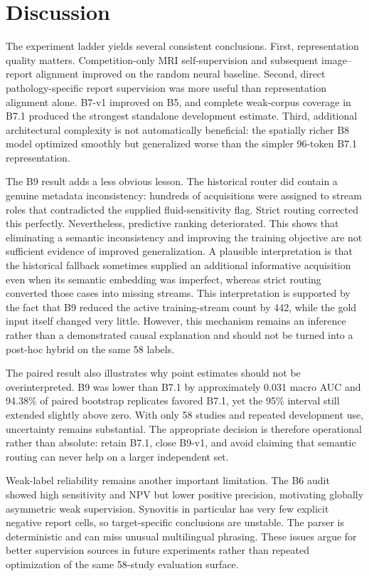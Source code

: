 \documentclass[preprint,12pt]{elsarticle}
\begin{document}
\section{Discussion}
\label{sec:discussion}

The experiment ladder yields several consistent conclusions. First, representation quality matters. Competition-only MRI self-supervision and subsequent image--report alignment improved on the random neural baseline. Second, direct pathology-specific report supervision was more useful than representation alignment alone. B7-v1 improved on B5, and complete weak-corpus coverage in B7.1 produced the strongest standalone development estimate. Third, additional architectural complexity is not automatically beneficial: the spatially richer B8 model optimized smoothly but generalized worse than the simpler 96-token B7.1 representation.

The B9 result adds a less obvious lesson. The historical router did contain a genuine metadata inconsistency: hundreds of acquisitions were assigned to stream roles that contradicted the supplied fluid-sensitivity flag. Strict routing corrected this perfectly. Nevertheless, predictive ranking deteriorated. This shows that eliminating a semantic inconsistency and improving the training objective are not sufficient evidence of improved generalization. A plausible interpretation is that the historical fallback sometimes supplied an additional informative acquisition even when its semantic embedding was imperfect, whereas strict routing converted those cases into missing streams. This interpretation is supported by the fact that B9 reduced the active training-stream count by 442, while the gold input itself changed very little. However, this mechanism remains an inference rather than a demonstrated causal explanation and should not be turned into a post-hoc hybrid on the same 58 labels.

The paired result also illustrates why point estimates should not be overinterpreted. B9 was lower than B7.1 by approximately 0.031 macro AUC and 94.38\% of paired bootstrap replicates favored B7.1, yet the 95\% interval still extended slightly above zero. With only 58 studies and repeated development use, uncertainty remains substantial. The appropriate decision is therefore operational rather than absolute: retain B7.1, close B9-v1, and avoid claiming that semantic routing can never help on a larger independent set.

Weak-label reliability remains another important limitation. The B6 audit showed high sensitivity and NPV but lower positive precision, motivating globally asymmetric weak supervision. Synovitis in particular has very few explicit negative report cells, so target-specific conclusions are unstable. The parser is deterministic and can miss unusual multilingual phrasing. These issues argue for better supervision sources in future experiments rather than repeated optimization of the same 58-study evaluation surface.
\end{document}
